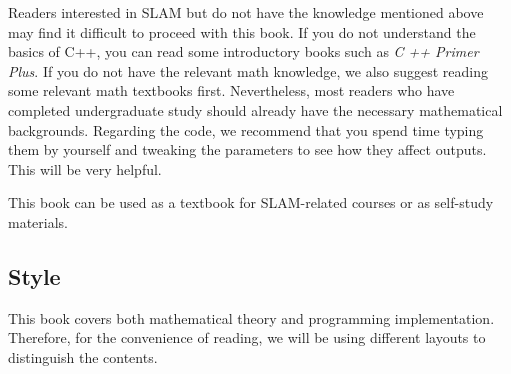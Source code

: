 \begin{Russian}
    
\end{Russian}

\begin{English}
    Readers interested in SLAM but do not have the knowledge mentioned above may find it difficult to proceed with this book. If you do not understand the basics of C++, you can read some introductory books such as \textit{C ++ Primer Plus}. If you do not have the relevant math knowledge, we also suggest reading some relevant math textbooks first. Nevertheless, most readers who have completed undergraduate study should already have the necessary mathematical backgrounds. Regarding the code, we recommend that you spend time typing them by yourself and tweaking the parameters to see how they affect outputs. This will be very helpful.

    This book can be used as a textbook for SLAM-related courses or as self-study materials.
\end{English}

\begin{Russian}
    
\end{Russian}

\begin{English}
    \section*{Style}
\end{English}

\begin{Russian}
    
\end{Russian}

\begin{English}
    This book covers both mathematical theory and programming implementation. Therefore, for the convenience of reading, we will be using different layouts to distinguish the contents.
\end{English}

\begin{Russian}
    
\end{Russian}

